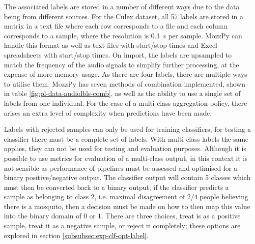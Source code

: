         The associated labels are stored in a number of different ways due to the data being from different sources. For the Culex dataset, all 57 labels are stored in a matrix in a text file where each row corresponds to a file and each column corresponds to a sample, where the resolution is \SI{0.1}{\s} per sample. MozzPy can handle this format as well as text files with start/stop times and Excel spreadsheets with start/stop times. On import, the labels are upsampled to match the frequency of the audio signals to simplify further processing, at the expense of more memory usage. As there are four labels, there are multiple ways to utilise them. MozzPy has seven methods of combination implemented, shown in table \ref{fig:pl-data-audiolbls-comb}, as well as the ability to use a single set of labels from one individual. For the case of a multi-class aggregation policy, there arises an extra level of complexity when predictions have been made.
        
        
        Labels with rejected samples can only be used for training classifiers, for testing a classifier there must be a complete set of labels. With multi-class labels the same applies, they can not be used for testing and evaluation purposes. Although it is possible to use metrics for evaluation of a multi-class output, in this context it is not sensible as performance of pipelines must be assessed and optimised for a binary positive/negative output. The classifier output will contain 5 classes which must then be converted back to a binary output; if the classifier predicts a sample as belonging to class 2, i.e. maximal disagreement of $2/4$ people believing there is a mosquito, then a decision must be made on how to then map this value into the binary domain of $0$ or $1$. There are three choices, treat is as a positive sample, treat it as a negative sample, or reject it completely; these options are explored in section \ref{subsubsec:exp-clf-opt-label}. 